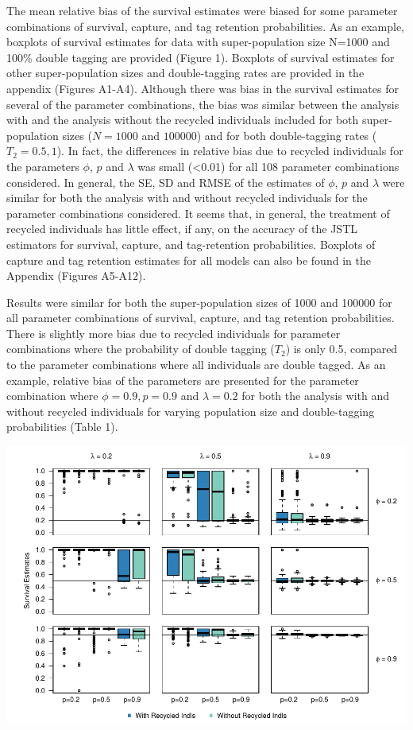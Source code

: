 \documentclass[]{article}
\begin{document}
The mean relative bias of the survival estimates were biased for some
parameter combinations of survival, capture, and tag retention
probabilities. As an example, boxplots of survival estimates for data
with super-population size N=1000 and 100\% double tagging are provided
(Figure 1). Boxplots of survival estimates for other super-population
sizes and double-tagging rates are provided in the appendix (Figures
A1-A4). Although there was bias in the survival estimates for several of
the parameter combinations, the bias was similar between the analysis
with and the analysis without the recycled individuals included for both
super-population sizes (\(N=1000\) and \(100000\)) and for both
double-tagging rates (\(T_2=0.5,1\)). In fact, the differences in
relative bias due to recycled individuals for the parameters \(\phi\),
\(p\) and \(\lambda\) was small (\textless{}0.01) for all 108 parameter
combinations considered. In general, the SE, SD and RMSE of the
estimates of \(\phi\), \(p\) and \(\lambda\) were similar for both the
analysis with and without recycled individuals for the parameter
combinations considered. It seems that, in general, the treatment of
recycled individuals has little effect, if any, on the accuracy of the
JSTL estimators for survival, capture, and tag-retention probabilities.
Boxplots of capture and tag retention estimates for all models can also
be found in the Appendix (Figures A5-A12).

Results were similar for both the super-population sizes of 1000 and
100000 for all parameter combinations of survival, capture, and tag
retention probabilities. There is slightly more bias due to recycled
individuals for parameter combinations where the probability of double
tagging (\(T_2\)) is only 0.5, compared to the parameter combinations
where all individuals are double tagged. As an example, relative bias of
the parameters are presented for the parameter combination where
\(\phi=0.9, p=0.9\) and \(\lambda=0.2\) for both the analysis with and
without recycled individuals for varying population size and
double-tagging probabilities (Table 1).

\includegraphics{RecycledPaper_files/figure-latex/Figure1_survival_GJSTL1-1.pdf}
\end{document}
